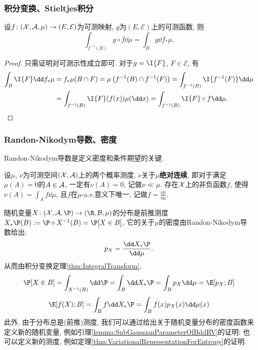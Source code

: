 \subsubsection{积分变换、Stieltjes积分}

\begin{theorem}[积分变换]\label{thm:IntegralTransform}
	设$f \colon (\mathcal{X}, \mathcal{A}, \mu) \to (E, \mathcal{E})$为可测映射, $g$为$(E, \mathcal{E})$上的可测函数, 则
	\begin{equation*}
		\int_{f^{-1}(B)} g \circ f \dd \mu 
		= \int_B g \dd f_* \mu. 
	\end{equation*}
\end{theorem}
\begin{proof}
	只需证明对可测示性成立即可. 
	对于$g = \I{F}$, $F \in \mathcal{E}$, 有
	\begin{align*}
		\int_B \I{F} \dd f_* \mu
		&= f_* \mu(B \cap F)
		= \mu \left( f^{-1}(B) \cap f^{-1}(F) \right)
		= \int_{f^{-1}(B)} \I{f^{-1}(F)} \dd \mu \\
		&= \int_{f^{-1}(B)} \I{F}(f(x)) \mu(\dd x)
		=\int_{f^{-1}(B)} \I{F} \circ f \dd \mu. 
	\end{align*}
\end{proof}




\subsubsection{Randon-Nikodym导数、密度}

Randon-Nikodym导数是定义密度和条件期望的关键. 

\begin{theorem}
	设$\mu$, $\nu$为可测空间$(\mathcal{X}, \mathcal{A})$上的两个概率测度, $\nu$关于$\mu$\textbf{绝对连续}, 即对于满足$\mu(A) = 0$的$A \in \mathcal{A}$, 一定有$\nu(A) = 0$, 记做$\nu \ll \mu$. 
	存在$\mathcal{X}$上的非负函数$f$, 使得$\nu(A) = \int_A f \dd \mu$, 且$f$在$\mu$-a.e.意义下唯一, 记做$f = \frac{\dd \nu}{\dd \mu}$. 
\end{theorem}

\begin{example}[分布的密度]
	随机变量$X \colon (\cX, \cA, \P) \to (\R, \cB, \mu)$的分布是前推测度$X_* \P (B) := \P \circ X^{-1} (B) = \P[X \in B]$, 它的关于$\mu$的密度由Randon-Nikodym导数给出: 
	\begin{equation*}
		p_X = \frac{\dd X_* \P}{\dd \mu}. 
	\end{equation*}
	从而由积分变换定理\ref{thm:IntegralTransform}, 
	\begin{equation*}
		\P[X \in B] 
		= \int_{X^{-1}(B)} \dd \P 
		= \int_B \dd X_* \P 
		= \int_B p_X \dd \mu
		= \E[p_X; B]
	\end{equation*}
	\begin{equation*}
		\E[f(X); B]
		= \int_B f \dd X_* \P 
		= \int_B f(x) p_X(x) \dd \mu(x)
	\end{equation*}
	此外, 由于分布总是(前推)测度, 我们可以通过给出关于随机变量分布的密度函数来定义新的随机变量, 例如引理\ref{lemma:SubGaussianParameterOfBddRV}的证明; 也可以定义新的测度, 例如定理\ref{thm:VariationalRepresentationForEntropy}的证明. 
\end{example}



